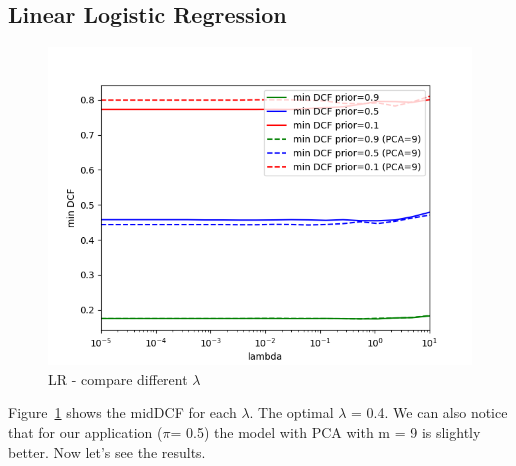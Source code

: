 \documentclass[english]{report}
\begin{document}
\subsection{Linear Logistic Regression}

\begin{figure}[h!]
    \includegraphics[scale=0.5]{../../images/evaluation/LR_PCA_minDCF_comparison}
    \centering
    \caption{LR - compare different $\lambda$}
    \label{fig:LR_eval}
\end{figure}
Figure~\ref{fig:LR_eval} shows the midDCF for each $\lambda$.
The optimal $\lambda$ = 0.4. We can also notice that for our application ($\pi$= 0.5) the model with PCA with m = 9 is slightly better.
Now let's see the results.
\end{document}
